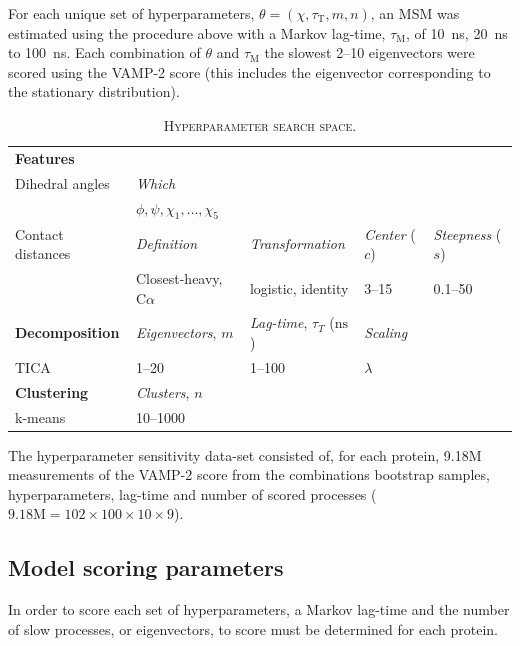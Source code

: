 \documentclass[journal=jacsat,manuscript=article]{achemso}
\begin{document}
For each unique set of hyperparameters, $\theta = (\chi, \tau_{\mathrm{T}}, m, n)$,  an MSM was estimated using the procedure above with a Markov lag-time, $\tau_{\mathrm{M}}$, of \SI{10}{\nano\second}, \SI{20}{\nano\second} to \SI{100}{\nano\second}. Each combination of $\theta$ and  $\tau_{\mathrm{M}}$ the slowest \numrange{2}{10} eigenvectors were scored using the VAMP-2 score (this includes the eigenvector corresponding to the stationary distribution). 

\begin{table}
    \centering
    \begin{tabularx}{\textwidth}{lXXXX}
    \toprule
    \textbf{Features}  & & & &\\
    Dihedral angles & \emph{Which} & & &\\
    & $\phi, \psi, \chi_{1}, \ldots, \chi_{5}$ & & & \\
    Contact distances &  \emph{Definition} & \emph{Transformation}& \emph{Center} ($c$) & \emph{Steepness} ($s$) \\

     & Closest-heavy, C$\alpha$ & logistic, identity &  \numrange{3}{15} & \numrange{0.1}{50} \\
    \midrule
    \textbf{Decomposition} & \emph{Eigenvectors}, $m$ & \emph{Lag-time}, $\tau_{T}$ ($\si{\nano\second}$) & \emph{Scaling}\\ 
    TICA & \numrange{1}{20} & \numrange{1}{100} & $\lambda$\\
    \midrule
    \textbf{Clustering} & \emph{Clusters}, $n$ &\\
    k-means & \numrange{10}{1000} & \\
    \bottomrule
    \end{tabularx}
    \caption{\textsc{Hyperparameter search space}. }
    \label{tab:search_space}
\end{table}

The hyperparameter sensitivity data-set consisted of, for each protein, 9.18M measurements of the VAMP-2 score from the combinations bootstrap samples, hyperparameters, lag-time and number of scored processes  ($9.18\mathrm{M}=102 \times 100 \times 10 \times 9$). 

\subsection{Model scoring parameters}\label{model_score_params}
In order to score each set of hyperparameters, a Markov lag-time and the number of slow processes, or eigenvectors, to score must be determined for each protein. 
\end{document}

